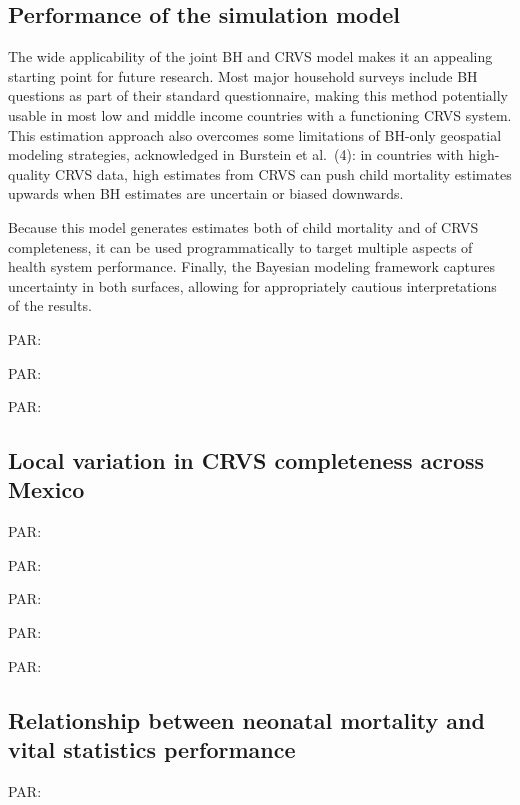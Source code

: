 \documentclass[
]{article}
\begin{document}
\hypertarget{performance-of-the-simulation-model}{%
\subsection{Performance of the simulation model}\label{performance-of-the-simulation-model}}

The wide applicability of the joint BH and CRVS model makes it an appealing starting point for future research. Most major household surveys include BH questions as part of their standard questionnaire, making this method potentially usable in most low and middle income countries with a functioning CRVS system. This estimation approach also overcomes some limitations of BH-only geospatial modeling strategies, acknowledged in Burstein et al.~(4): in countries with high-quality CRVS data, high estimates from CRVS can push child mortality estimates upwards when BH estimates are uncertain or biased downwards.

Because this model generates estimates both of child mortality and of CRVS completeness, it can be used programmatically to target multiple aspects of health system performance. Finally, the Bayesian modeling framework captures uncertainty in both surfaces, allowing for appropriately cautious interpretations of the results.

PAR:

PAR:

PAR:

\hypertarget{local-variation-in-crvs-completeness-across-mexico}{%
\subsection{Local variation in CRVS completeness across Mexico}\label{local-variation-in-crvs-completeness-across-mexico}}

PAR:

PAR:

PAR:

PAR:

PAR:

\hypertarget{relationship-between-neonatal-mortality-and-vital-statistics-performance}{%
\subsection{Relationship between neonatal mortality and vital statistics performance}\label{relationship-between-neonatal-mortality-and-vital-statistics-performance}}

PAR:
\end{document}
